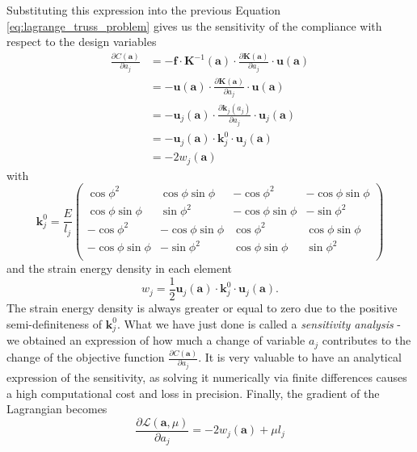 Substituting this expression into the previous Equation \eqref{eq:lagrange_truss_problem} gives us the sensitivity of the compliance with respect to the design variables 
\begin{align}
    \frac{\partial C (\mathbf{a})}{\partial a_j} 
    &= - \mathbf{f} \cdot \mathbf{K}^{-1}(\mathbf{a}) \cdot \frac{\partial \mathbf{K} (\mathbf{a})}{\partial a_j} \cdot \mathbf{u} (\mathbf{a})  \\
    &= - \mathbf{u} (\mathbf{a}) \cdot \frac{\partial \mathbf{K} (\mathbf{a})}{\partial a_j} \cdot \mathbf{u} (\mathbf{a})  \\
    &= - \mathbf{u}_j (\mathbf{a}) \cdot \frac{\partial \mathbf{k}_j(a_j)}{\partial a_j} \cdot \mathbf{u}_j (\mathbf{a})  \\
    &= - \mathbf{u}_j (\mathbf{a}) \cdot \mathbf{k}^0_j \cdot \mathbf{u}_j (\mathbf{a})  \\
    &= - 2 w_j (\mathbf{a})
    \label{eq:compliance_sensitivity}
\end{align}
with 
\begin{equation}
    \mathbf{k}_j^0 = \frac{E}{l_j}
    \begin{pmatrix}
    \cos{\phi}^2 & \cos{\phi}\sin{\phi} & -\cos{\phi}^2 & -\cos{\phi}\sin{\phi} \\
    \cos{\phi}\sin{\phi} & \sin{\phi}^2 & -\cos{\phi}\sin{\phi} & -\sin{\phi}^2 \\
    -\cos{\phi}^2 & -\cos{\phi}\sin{\phi} & \cos{\phi}^2 &\cos{\phi}\sin{\phi} \\
    -\cos{\phi}\sin{\phi} & -\sin{\phi}^2 & \cos{\phi}\sin{\phi} & \sin{\phi}^2 \\
    \end{pmatrix}
\end{equation}
and the strain energy density in each element 
\begin{equation}
    w_j = \frac{1}{2} \mathbf{u}_j (\mathbf{a}) \cdot \mathbf{k}^0_j \cdot \mathbf{u}_j (\mathbf{a}).
    \label{eq:element_strain_energy}
\end{equation}
The strain energy density is always greater or equal to zero due to the positive semi-definiteness of $\mathbf{k}^0_j$.
What we have just done is called a \emph{sensitivity analysis} - we obtained an expression of how much a change of variable $a_j$ contributes to the change of the objective function $\frac{\partial C (\mathbf{a})}{\partial a_j}$. It is very valuable to have an analytical expression of the sensitivity, as solving it numerically via finite differences causes a high computational cost and loss in precision.
Finally, the gradient of the Lagrangian becomes 
\begin{equation}
    \frac{\partial \mathcal{L} (\mathbf{a}, \mu)}{\partial a_j} 
    = - 2 w_j (\mathbf{a}) + \mu l_j
    \label{eq:lagrange_sensitivity}
\end{equation}

